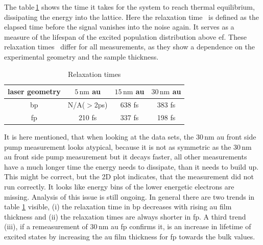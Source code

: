 \documentclass[a4paper,12pt,twoside]{article}
\begin{document}
\noindent
The table\,\ref{relax} shows the time it takes for the system to reach thermal equilibrium, dissipating the energy into the lattice. Here the relaxation time \texttau\, is defined as the elapsed time before the signal vanishes into the noise again. It serves as a measure of the lifespan of the excited population distribution above \gls{ef}. These relaxation times \texttau\, differ for all measurements, as they show a dependence on the experimental geometry and the sample thickness.
	\begin{table}[H]
	    \centering
		\caption{Relaxation times \texttau}
		\begin{tabular}{cccc}
			laser geometry & $5\,\mathrm{\mbox{nm}}$ \gls{au} & $15\,\mathrm{\mbox{nm}}$ \gls{au} & $30\,\mathrm{\mbox{nm}}$ \gls{au} \\
			\hline
			\gls{bp} & N/A($>$2ps) & 638 fs & 383 fs \\
			\gls{fp} & 210 fs & 337 fs & 198 fs \\
		\end{tabular}
	    	\label{relax}
	\end{table}
	
It is here mentioned, that when looking at the data sets, the $30\,\mathrm{\mbox{nm}}$ \gls{au} front side pump measurement looks atypical, because it is not as symmetric as the $30\,\mathrm{\mbox{nm}}$ \gls{au} front side pump measurement but it decays faster, all other measurements have a much longer time the energy needs to dissipate, than it needs to build up. This might be correct, but the 2D plot indicates, that the measurement did not run correctly. It looks like energy bins of the lower energetic electrons are missing. Analysis of this issue is still ongoing. In general there are two trends in table \ref{relax} visible, (i) the relaxation time in \gls{bp} decreases with rising \gls{au} film thickness and (ii) the relaxation times are always shorter in \gls{fp}. A third trend (iii), if a remeasurement of $30\,\mathrm{\mbox{nm}}$ \gls{au} \gls{fp} confirms it, is an increase in lifetime of excited states by increasing the \gls{au} film thickness for \gls{fp} towards the bulk values.
\end{document}
